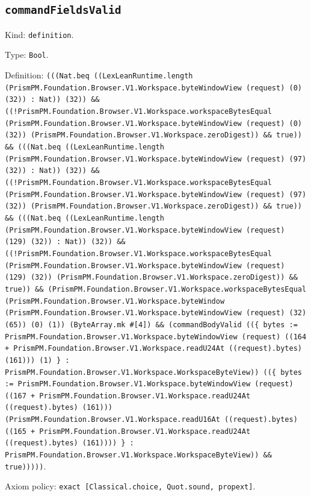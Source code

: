 \documentclass[11pt]{article}
\begin{document}
\subsection*{\texttt{commandFieldsValid}}
\noindent Kind: \texttt{definition}.\par
\noindent Type: \texttt{Bool}.\par
\noindent Definition: \texttt{(((Nat.beq ((LexLeanRuntime.length (PrismPM.Foundation.Browser.V1.Workspace.byteWindowView (request) (0) (32)) : Nat)) (32)) \&\& ((!PrismPM.Foundation.Browser.V1.Workspace.workspaceBytesEqual (PrismPM.Foundation.Browser.V1.Workspace.byteWindowView (request) (0) (32)) (PrismPM.Foundation.Browser.V1.Workspace.zeroDigest)) \&\& true)) \&\& (((Nat.beq ((LexLeanRuntime.length (PrismPM.Foundation.Browser.V1.Workspace.byteWindowView (request) (97) (32)) : Nat)) (32)) \&\& ((!PrismPM.Foundation.Browser.V1.Workspace.workspaceBytesEqual (PrismPM.Foundation.Browser.V1.Workspace.byteWindowView (request) (97) (32)) (PrismPM.Foundation.Browser.V1.Workspace.zeroDigest)) \&\& true)) \&\& (((Nat.beq ((LexLeanRuntime.length (PrismPM.Foundation.Browser.V1.Workspace.byteWindowView (request) (129) (32)) : Nat)) (32)) \&\& ((!PrismPM.Foundation.Browser.V1.Workspace.workspaceBytesEqual (PrismPM.Foundation.Browser.V1.Workspace.byteWindowView (request) (129) (32)) (PrismPM.Foundation.Browser.V1.Workspace.zeroDigest)) \&\& true)) \&\& (PrismPM.Foundation.Browser.V1.Workspace.workspaceBytesEqual (PrismPM.Foundation.Browser.V1.Workspace.byteWindow (PrismPM.Foundation.Browser.V1.Workspace.byteWindowView (request) (32) (65)) (0) (1)) (ByteArray.mk \#[4]) \&\& (commandBodyValid ((\{ bytes := PrismPM.Foundation.Browser.V1.Workspace.byteWindowView (request) ((164 + PrismPM.Foundation.Browser.V1.Workspace.readU24At ((request).bytes) (161))) (1) \} : PrismPM.Foundation.Browser.V1.Workspace.WorkspaceByteView)) ((\{ bytes := PrismPM.Foundation.Browser.V1.Workspace.byteWindowView (request) ((167 + PrismPM.Foundation.Browser.V1.Workspace.readU24At ((request).bytes) (161))) (PrismPM.Foundation.Browser.V1.Workspace.readU16At ((request).bytes) ((165 + PrismPM.Foundation.Browser.V1.Workspace.readU24At ((request).bytes) (161)))) \} : PrismPM.Foundation.Browser.V1.Workspace.WorkspaceByteView)) \&\& true)))))}.\par
\noindent Axiom policy: \texttt{exact [Classical.choice, Quot.sound, propext]}.\par
\end{document}
